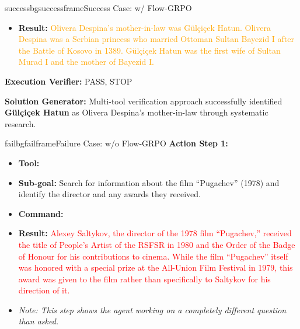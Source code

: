 \begin{small}
\begin{center}
\begin{casebox}{successbg}{successframe}{Success Case: \model w/ Flow-GRPO}
\begin{itemize}[nosep, leftmargin=*]
        \item \textbf{Result:} \textcolor{orange}{Olivera Despina's mother-in-law was Gülçiçek Hatun. Olivera Despina was a Serbian princess who married Ottoman Sultan Bayezid I after the Battle of Kosovo in 1389. Gülçiçek Hatun was the first wife of Sultan Murad I and the mother of Bayezid I.}
    \end{itemize}

    \vspace{1em}

    \textbf{Execution Verifier:} \textcolor{successframe}{PASS, STOP}

    \vspace{1em}

    \textbf{Solution Generator:} \textcolor{successframe}{Multi-tool verification approach successfully identified \textbf{Gülçiçek Hatun} as Olivera Despina's mother-in-law through systematic research.}

\end{casebox}

\begin{casebox}{failbg}{failframe}{Failure Case: \model w/o Flow-GRPO}
    \textbf{Action Step 1:}
    \begin{itemize}[nosep, leftmargin=*]
        \item \textbf{Tool:} 
        \item \textbf{Sub-goal:} Search for information about the film ``Pugachev'' (1978) and identify the director and any awards they received.
        \item \textbf{Command:}

        \item \textbf{Result:} \textcolor{red}{Alexey Saltykov, the director of the 1978 film ``Pugachev,'' received the title of People's Artist of the RSFSR in 1980 and the Order of the Badge of Honour for his contributions to cinema. While the film ``Pugachev'' itself was honored with a special prize at the All-Union Film Festival in 1979, this award was given to the film rather than specifically to Saltykov for his direction of it.}
        \item \textit{Note: This step shows the agent working on a completely different question than asked.}
    \end{itemize}


\end{casebox}
\end{center}
\end{small}
